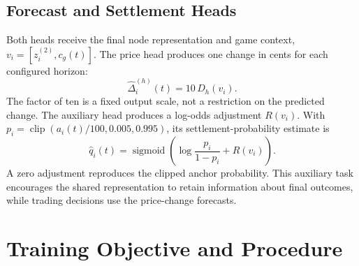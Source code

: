 \documentclass[12pt,a4paper,oneside]{report}
\begin{document}
\subsection{Forecast and Settlement Heads}
Both heads receive the final node representation and game context,
$v_i=[z_i^{(2)},c_g(t)]$. The price head produces one change in cents for each
configured horizon:
\begin{equation}
 \widehat\Delta_i^{(h)}(t)=10\,D_h(v_i).
\end{equation}
The factor of ten is a fixed output scale, not a restriction on the predicted
change. The auxiliary head produces a log-odds adjustment $R(v_i)$. With
$p_i=\operatorname{clip}(a_i(t)/100,0.005,0.995)$, its settlement-probability
estimate is
\begin{equation}
 \widehat q_i(t)=\operatorname{sigmoid}\!\left(
 \log\frac{p_i}{1-p_i}+R(v_i)\right).
 \label{eq:settlement-head}
\end{equation}
A zero adjustment reproduces the clipped anchor probability. This auxiliary
task encourages the shared representation to retain information about final
outcomes, while trading decisions use the price-change forecasts.

\section{Training Objective and Procedure}\label{sec:ingame-training}
\end{document}
